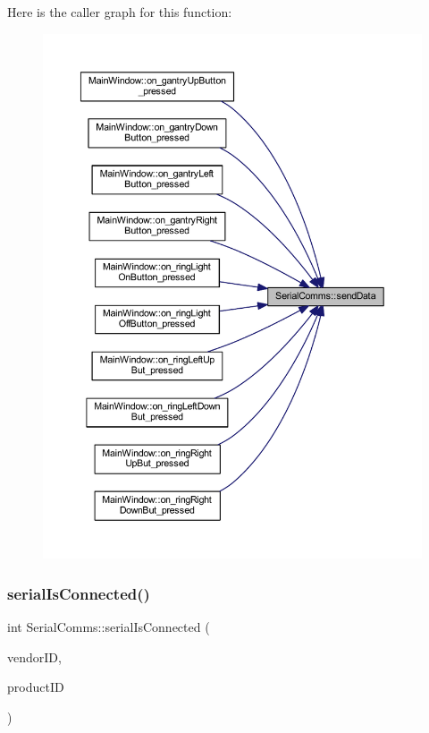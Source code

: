 Here is the caller graph for this function\+:
\nopagebreak
\begin{figure}[H]
\begin{center}
\leavevmode
\includegraphics[width=350pt]{class_serial_comms_abcbc3cce26ff395684de26a07da7ca26_icgraph}
\end{center}
\end{figure}
\mbox{\label{class_serial_comms_ad9980837a7d0672d100b0b83e3e47451}} 
\subsubsection{\texorpdfstring{serialIsConnected()}{serialIsConnected()}}
{\footnotesize\ttfamily int Serial\+Comms\+::serial\+Is\+Connected (\begin{DoxyParamCaption}\item[{Q\+String}]{vendor\+ID,  }\item[{Q\+String}]{product\+ID }\end{DoxyParamCaption})}



